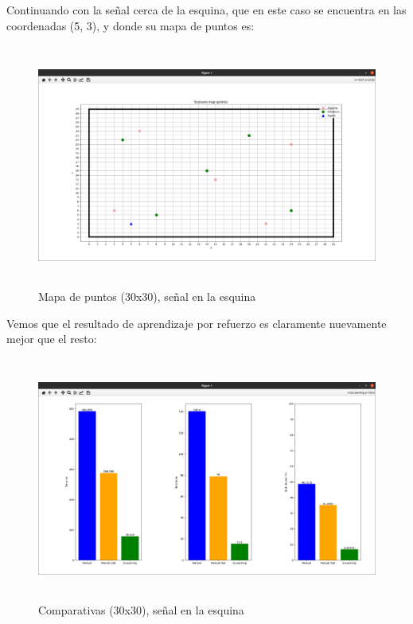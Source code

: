 Continuando con la señal cerca de la esquina, que en este caso se encuentra en las coordenadas (5, 3), y donde su mapa de puntos es:\\

\begin{figure} [H]
    \begin{center}
    \includegraphics[height=8cm]{imagenes/cap4/23_mapa_p_esq_30.png}
    \end{center}
    \caption[Mapa de puntos (30x30), señal en la esquina]{Mapa de puntos (30x30), señal en la esquina}
    \label{fig:map_p_esq_30}
\end{figure}

Vemos que el resultado de aprendizaje por refuerzo es claramente nuevamente mejor que el resto:\\

\begin{figure} [H]
    \begin{center}
    \includegraphics[height=8cm]{imagenes/cap4/24_comp_esq_30.png}
    \end{center}
    \caption[Comparativas (30x30), señal en la esquina]{Comparativas (30x30), señal en la esquina}
    \label{fig:comp_esq_30}
\end{figure}


